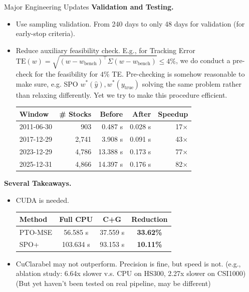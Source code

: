 \documentclass[aspectratio=169,xcolor=dvipsnames]{beamer}
\begin{document}
\begin{frame}[allowframebreaks]{Major Engineering Updates}
\break
\textbf{Validation and Testing.}
\begin{itemize}
    \item Use sampling validation. From 240 days to only 48 days for validation (for early-stop criteria). 
    \item Reduce auxiliary feasibility check. E.g., for Tracking Error $\text{TE}(w) = \sqrt{(w - w_{\text{bench}})^\top \Sigma (w - w_{\text{bench}})} \leq 4\%$, we do conduct a pre-check for the feasibility for $4\%$ TE. Pre-checking is somehow reasonable to make sure, e.g. SPO $w^*(\hat{y}), w^*(y_{\text{true}})$ solving the same problem rather than relaxing differently. Yet we try to make this procedure efficient.
    \begin{table}
        \centering
        \footnotesize
        \setlength{\tabcolsep}{4pt}
        \begin{tabular}{l r r r r}
            \toprule
            \textbf{Window} & \textbf{\# Stocks} & \textbf{Before} & \textbf{After} & \textbf{Speedup} \\
            \midrule
            2011-06-30 & 903   & 0.487 s  & 0.028 s & 17$\times$ \\
            2017-12-29 & 2,741 & 3.908 s  & 0.091 s & 43$\times$ \\
            2023-12-29 & 4,786 & 13.388 s & 0.173 s & 77$\times$ \\
            2025-12-31 & 4,866 & 14.397 s & 0.176 s & 82$\times$ \\
            \bottomrule
        \end{tabular}
    \end{table}
\end{itemize}

\break

\textbf{Several Takeaways.}
\begin{itemize}
    \item CUDA is needed.
    \begin{table}
        \centering
        \footnotesize
        \setlength{\tabcolsep}{4pt}
        \begin{tabular}{l c c c}
            \toprule
            \textbf{Method} & \textbf{Full CPU} & \textbf{C+G} & \textbf{Reduction} \\
            \midrule
            PTO-MSE & 56.585 s & 37.559 s & \textbf{33.62\%} \\
            SPO+    & 103.634 s & 93.153 s & \textbf{10.11\%} \\
            \bottomrule
        \end{tabular}
    \end{table}
    \item CuClarabel may not outperform. Precision is fine, but speed is not. (e.g., ablation study: 6.64x slower v.s. CPU on HS300, 2.27x slower on CSI1000) (But yet haven't been tested on real pipeline, may be different)
\end{itemize}

\end{frame}
\end{document}
